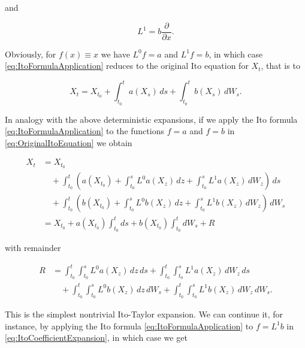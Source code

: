 \noindent and

\begin{equation} \label{eq:OperatorL1}
    L^1 = b \frac{\partial}{\partial x}.
\end{equation}

\noindent Obviously, for \(f(x) \equiv x\) we have \(L^0 f = a\) and \(L^1 f = b\), in which case \eqref{eq:ItoFormulaApplication} reduces to the original Ito equation for \(X_t\), that is to

\begin{equation} \label{eq:OriginalItoEquation}
    X_t = X_{t_0} + \int_{t_0}^t a(X_s) \, ds + \int_{t_0}^t b(X_s) \, dW_s.
\end{equation}

\noindent In analogy with the above deterministic expansions, if we apply the Ito formula \eqref{eq:ItoFormulaApplication} to the functions \(f = a\) and \(f = b\) in \eqref{eq:OriginalItoEquation} we obtain

\begin{equation} \label{eq:ItoCoefficientExpansion}
\begin{split}
    X_t &= X_{t_0} \\
    &\quad + \int_{t_0}^t \left( a(X_{t_0}) + \int_{t_0}^s L^0 a(X_z) \, dz + \int_{t_0}^s L^1 a(X_z) \, dW_z \right) \, ds \\
    &\quad + \int_{t_0}^t \left( b(X_{t_0}) + \int_{t_0}^s L^0 b(X_z) \, dz + \int_{t_0}^s L^1 b(X_z) \, dW_z \right) \, dW_s \\
    &= X_{t_0} + a(X_{t_0}) \int_{t_0}^t ds + b(X_{t_0}) \int_{t_0}^t dW_s + R
\end{split}
\end{equation}

\noindent with remainder

\begin{equation} \label{eq:FirstRemainder}
\begin{split}
    R &= \int_{t_0}^t \int_{t_0}^s L^0 a(X_z) \, dz \, ds + \int_{t_0}^t \int_{t_0}^s L^1 a(X_z) \, dW_z \, ds \\
    &\quad + \int_{t_0}^t \int_{t_0}^s L^0 b(X_z) \, dz \, dW_s + \int_{t_0}^t \int_{t_0}^s L^1 b(X_z) \, dW_z \, dW_s.
\end{split}
\end{equation}

\noindent This is the simplest nontrivial Ito-Taylor expansion. We can continue it, for instance, by applying the Ito formula \eqref{eq:ItoFormulaApplication} to \(f = L^1 b\) in \eqref{eq:ItoCoefficientExpansion}, in which case we get

